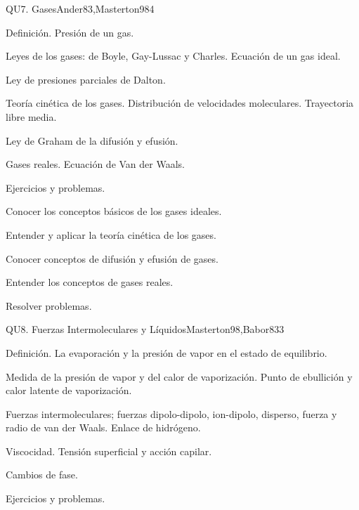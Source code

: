 \begin{syllabus}
\begin{unit}{QU7. Gases}{Ander83,Masterton98}{4}
\begin{topics}
      \item Definición. Presión de un gas.
      \item Leyes de los gases: de Boyle, Gay-Lussac y Charles. Ecuación de un gas ideal.
      \item Ley de presiones parciales de Dalton.
      \item Teoría cinética de los gases. Distribución de velocidades moleculares. Trayectoria libre media.
      \item Ley de Graham de la difusión y efusión.
      \item Gases reales. Ecuación de Van der Waals.
      \item Ejercicios y problemas.
   \end{topics}

   \begin{learningoutcomes}
      \item Conocer los conceptos básicos de los gases ideales.
      \item Entender y aplicar la teoría cinética de los gases.
      \item Conocer conceptos de difusión y efusión de gases.
      \item Entender los conceptos de gases reales.
      \item Resolver problemas.
   \end{learningoutcomes}
\end{unit}

\begin{unit}{QU8. Fuerzas Intermoleculares y Líquidos}{Masterton98,Babor83}{3}
\begin{topics}
      \item Definición. La evaporación y la presión de vapor en el estado de equilibrio.
      \item Medida de la presión de vapor y del calor de vaporización. Punto de ebullición y calor latente de vaporización.
      \item Fuerzas intermoleculares; fuerzas dipolo-dipolo, ion-dipolo, disperso, fuerza y radio de van der Waals. Enlace de hidrógeno.
      \item Viscocidad. Tensión superficial y acción capilar.
      \item Cambios de fase.
      \item Ejercicios y problemas.
    \end{topics}


\end{unit}
\end{syllabus}
